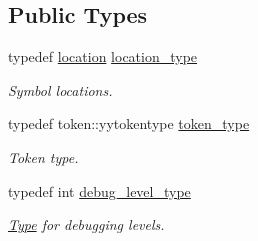 \subsection*{Public Types}
\begin{DoxyCompactItemize}
\item 
\hypertarget{classyy_1_1CParser_a674649435d1e3521d1e820a5139f7232}{typedef \hyperlink{classyy_1_1location}{location} \hyperlink{classyy_1_1CParser_a674649435d1e3521d1e820a5139f7232}{location\-\_\-type}}\label{classyy_1_1CParser_a674649435d1e3521d1e820a5139f7232}

\begin{DoxyCompactList}\small\item\em Symbol locations. \end{DoxyCompactList}\item 
\hypertarget{classyy_1_1CParser_aeef68a094a54c8a22e45c576c2bb5244}{typedef token\-::yytokentype \hyperlink{classyy_1_1CParser_aeef68a094a54c8a22e45c576c2bb5244}{token\-\_\-type}}\label{classyy_1_1CParser_aeef68a094a54c8a22e45c576c2bb5244}

\begin{DoxyCompactList}\small\item\em Token type. \end{DoxyCompactList}\item 
\hypertarget{classyy_1_1CParser_aeacca32970a6225584a65508390263af}{typedef int \hyperlink{classyy_1_1CParser_aeacca32970a6225584a65508390263af}{debug\-\_\-level\-\_\-type}}\label{classyy_1_1CParser_aeacca32970a6225584a65508390263af}

\begin{DoxyCompactList}\small\item\em \hyperlink{classType}{Type} for debugging levels. \end{DoxyCompactList}\end{DoxyCompactItemize}
